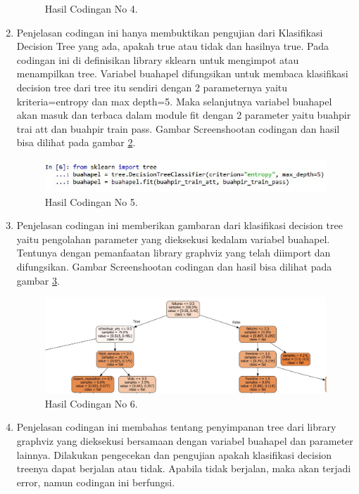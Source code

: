 \begin{enumerate}
\begin{figure}[!htbp]
		\caption{Hasil Codingan No 4.}
		\label{12}
\end{figure}
\item Penjelasan codingan ini hanya membuktikan pengujian dari Klasifikasi Decision Tree yang ada, apakah true atau tidak dan hasilnya true. Pada codingan ini di definisikan library sklearn untuk mengimpot atau menampilkan tree. Variabel buahapel difungsikan untuk membaca klasifikasi decision tree dari tree itu sendiri dengan 2 parameternya yaitu kriteria=entropy dan max depth=5. Maka selanjutnya variabel buahapel akan masuk dan terbaca dalam module fit dengan 2 parameter yaitu buahpir trai att dan buahpir train pass.
\subitem Gambar Screenshootan codingan dan hasil bisa dilihat pada gambar \ref{13}.
\begin{figure}[!htbp]
		\centerline{\includegraphics[width=1\textwidth]{figures/huda/5_hari4.JPG}}
		\caption{Hasil Codingan No 5.}
		\label{13}
\end{figure}
\item Penjelasan codingan ini memberikan gambaran dari klasifikasi decision tree yaitu pengolahan parameter yang dieksekusi kedalam variabel buahapel. Tentunya dengan pemanfaatan library graphviz yang telah diimport dan difungsikan.
\subitem Gambar Screenshootan codingan dan hasil bisa dilihat pada gambar \ref{14}.
\begin{figure}[!htbp]
		\centerline{\includegraphics[width=1\textwidth]{figures/huda/6_hari4.JPG}}
		\caption{Hasil Codingan No 6.}
		\label{14}
\end{figure}
\item Penjelasan codingan ini membahas tentang penyimpanan tree dari library graphviz yang dieksekusi bersamaan dengan variabel buahapel dan parameter lainnya. Dilakukan pengecekan dan pengujian apakah klasifikasi decision treenya dapat berjalan atau tidak. Apabila tidak berjalan, maka akan terjadi error, namun codingan ini berfungsi.

\end{enumerate}
